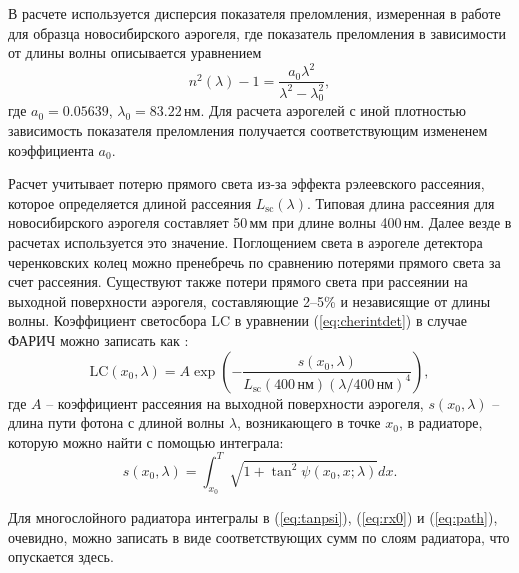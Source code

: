 \documentclass[12pt]{article}
\begin{document}
В расчете используется дисперсия показателя преломления, измеренная в работе \cite{aerdisp} для 
образца новосибирского аэрогеля, где показатель преломления в зависимости от длины волны описывается уравнением
\[n^2(\lambda)-1 = \frac{a_0 \lambda^2}{\lambda^2-\lambda_0^2},\]
где $a_0 = 0.05639$, $\lambda_0 = 83.22\,\textrm{нм}$. 
Для расчета аэрогелей с иной плотностью зависимость показателя преломления получается соответствующим измененем 
коэффициента $a_0$.

Расчет учитывает потерю прямого света из-за эффекта рэлеевского рассеяния, которое определяется длиной рассеяния $L_\textrm{sc}(\lambda)$.
Типовая длина рассеяния для новосибирского аэрогеля составляет 50\,мм при длине волны 400\,нм. Далее везде в расчетах используется это значение. 
Поглощением света в аэрогеле детектора черенковских колец можно пренебречь по сравнению потерями прямого света за счет рассеяния. Существуют также потери
прямого света при рассеянии на выходной поверхности аэрогеля, составляющие 2--5\% и независящие от длины волны.
Коэффициент светосбора $\mathrm{LC}$ в уравнении (\ref{eq:cherintdet}) в случае ФАРИЧ можно записать как \cite{aerscat}:
\[\mathrm{LC}(x_0,\lambda) = A \exp\left(-\frac{s(x_0,\lambda)}{L_\textrm{sc}(400\,\textrm{нм})\left(\lambda / 400\,\textrm{нм}\right)^4}\right),\]
где $A$ -- коэффициент рассеяния на выходной поверхности аэрогеля, $s(x_0,\lambda)$ -- длина пути фотона с длиной волны $\lambda$, 
возникающего в точке $x_0$, в радиаторе, которую можно найти с помощью интеграла:
\begin{equation}
s(x_0,\lambda) = \int_{x_0}^T \sqrt{1+\tan^2\psi(x_0,x;\lambda)} dx.
\label{eq:path}
\end{equation}

Для многослойного радиатора интегралы в (\ref{eq:tanpsi}), (\ref{eq:rx0}) и (\ref{eq:path}), очевидно, можно записать в виде соответствующих сумм по слоям радиатора, 
что опускается здесь.
\end{document}
